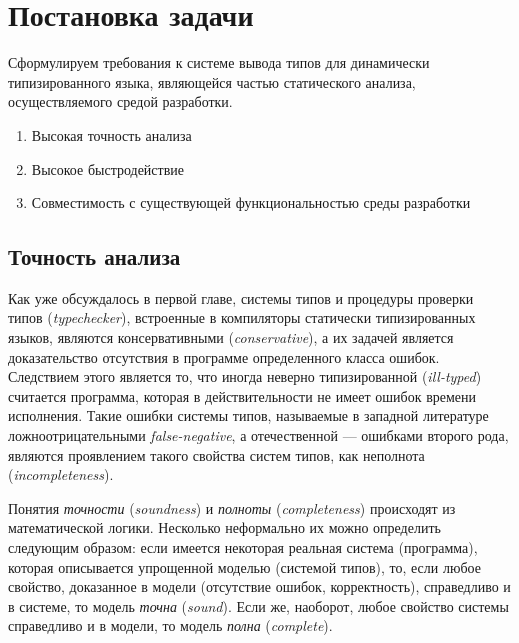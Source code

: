 \chapter{Постановка задачи}

Сформулируем требования к системе вывода типов для динамически
типизированного языка, являющейся частью статического анализа, осуществляемого
средой разработки.

\begin{enumerate}
    \item{Высокая точность анализа}
    \item{Высокое быстродействие}
    \item{Совместимость с существующей функциональностью среды разработки}
\end{enumerate}

\section{Точность анализа}
\label{sec:precision-requirement}

Как уже обсуждалось в первой главе, системы типов и процедуры проверки типов
(\emph{typechecker}), встроенные в компиляторы статически типизированных
языков, являются консервативными (\emph{conservative}), а их задачей является
доказательство отсутствия в программе определенного класса ошибок. Следствием
этого является то, что иногда неверно типизированной (\emph{ill-typed})
считается программа, которая в действительности не имеет ошибок времени
исполнения. Такие ошибки системы типов, называемые в западной литературе
ложноотрицательными \emph{false-negative}, а отечественной --- ошибками второго
рода, являются проявлением такого свойства систем типов, как неполнота
(\emph{incompleteness}). 

Понятия \emph{точности} (\emph{soundness}) и \emph{полноты}
(\emph{completeness}) происходят из математической логики. Несколько неформально
их можно определить следующим образом: если имеется некоторая реальная система
(программа), которая описывается упрощенной моделью (системой типов), то, если
любое свойство, доказанное в модели (отсутствие ошибок, корректность),
справедливо и в системе, то модель \emph{точна} (\emph{sound}).  Если же,
наоборот, любое свойство системы справедливо и в модели, то модель \emph{полна}
(\emph{complete}).

